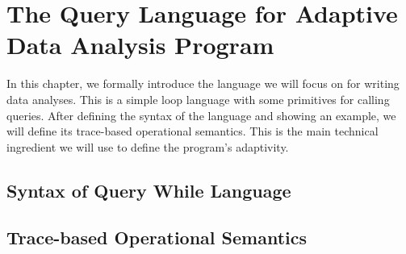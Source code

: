 \chapter{The Query Language for Adaptive Data Analysis Program}
\label{ch:language}
In this chapter, we formally introduce the language we will focus on for writing data analyses.  
This is a simple loop language with some primitives for calling queries. 
After defining the syntax of the language and showing an example, we will define its trace-based operational semantics. 
This is the main technical ingredient we will use to define the program's adaptivity.

\section{Syntax of Query While Language}
\label{sec:language-syntax}

\section{Trace-based Operational Semantics}
\label{sec:language-os}
